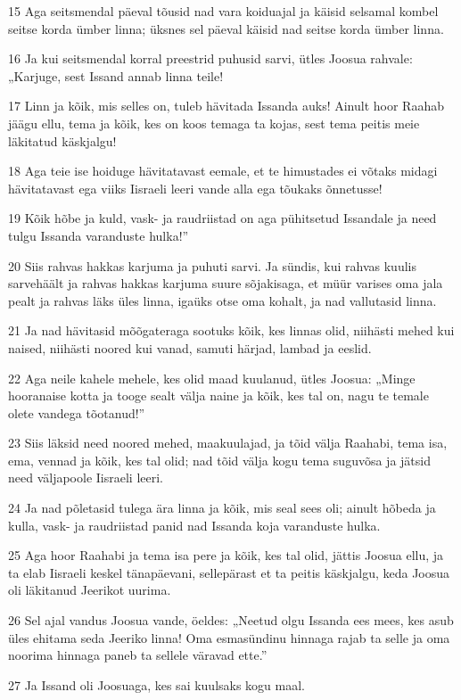 \par 15 Aga seitsmendal päeval tõusid nad vara koiduajal ja käisid selsamal kombel seitse korda ümber linna; üksnes sel päeval käisid nad seitse korda ümber linna.
\par 16 Ja kui seitsmendal korral preestrid puhusid sarvi, ütles Joosua rahvale: „Karjuge, sest Issand annab linna teile!
\par 17 Linn ja kõik, mis selles on, tuleb hävitada Issanda auks! Ainult hoor Raahab jäägu ellu, tema ja kõik, kes on koos temaga ta kojas, sest tema peitis meie läkitatud käskjalgu!
\par 18 Aga teie ise hoiduge hävitatavast eemale, et te himustades ei võtaks midagi hävitatavast ega viiks Iisraeli leeri vande alla ega tõukaks õnnetusse!
\par 19 Kõik hõbe ja kuld, vask- ja raudriistad on aga pühitsetud Issandale ja need tulgu Issanda varanduste hulka!”
\par 20 Siis rahvas hakkas karjuma ja puhuti sarvi. Ja sündis, kui rahvas kuulis sarvehäält ja rahvas hakkas karjuma suure sõjakisaga, et müür varises oma jala pealt ja rahvas läks üles linna, igaüks otse oma kohalt, ja nad vallutasid linna.
\par 21 Ja nad hävitasid mõõgateraga sootuks kõik, kes linnas olid, niihästi mehed kui naised, niihästi noored kui vanad, samuti härjad, lambad ja eeslid.
\par 22 Aga neile kahele mehele, kes olid maad kuulanud, ütles Joosua: „Minge hooranaise kotta ja tooge sealt välja naine ja kõik, kes tal on, nagu te temale olete vandega tõotanud!”
\par 23 Siis läksid need noored mehed, maakuulajad, ja tõid välja Raahabi, tema isa, ema, vennad ja kõik, kes tal olid; nad tõid välja kogu tema suguvõsa ja jätsid need väljapoole Iisraeli leeri.
\par 24 Ja nad põletasid tulega ära linna ja kõik, mis seal sees oli; ainult hõbeda ja kulla, vask- ja raudriistad panid nad Issanda koja varanduste hulka.
\par 25 Aga hoor Raahabi ja tema isa pere ja kõik, kes tal olid, jättis Joosua ellu, ja ta elab Iisraeli keskel tänapäevani, sellepärast et ta peitis käskjalgu, keda Joosua oli läkitanud Jeerikot uurima.
\par 26 Sel ajal vandus Joosua vande, öeldes: „Neetud olgu Issanda ees mees, kes asub üles ehitama seda Jeeriko linna! Oma esmasündinu hinnaga rajab ta selle ja oma noorima hinnaga paneb ta sellele väravad ette.”
\par 27 Ja Issand oli Joosuaga, kes sai kuulsaks kogu maal.


